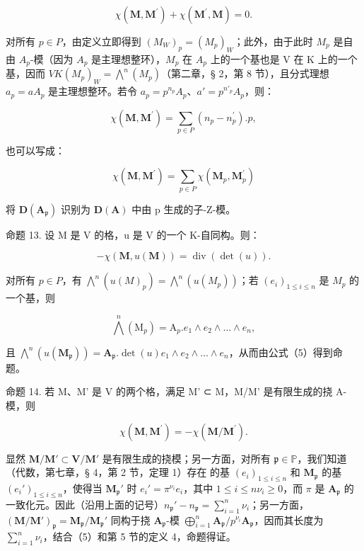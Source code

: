 \[
\chi (\mathbf {M}, \mathbf {M} ^ {\prime}) + \chi (\mathbf {M} ^ {\prime}, \mathbf {M}) = 0\tag{4}.
\]

对所有 \(p \in P\)，由定义立即得到 \((M_{W})_p = (M_p)_{W}\)；此外，由于此时 \(M_p\) 是自由 \(A_p\)-模（因为 \(A_p\) 是主理想整环），\(M_p\) 在 \(A_p\) 上的一个基也是 V 在 K 上的一个基，因而 \(V\)\(K\)\((M_p)_W = \bigwedge^n (M_p)\)（第二章，§ 2，第 8 节），且分式理想 \(a_p = aA_p\) 是主理想整环。若令 \(a_p = p^{n_p} A_p\)、\(a' = p^{n'_{p}} A_p\)，则：

\[
\chi (\mathbf {M}, \mathbf {M} ^ {\prime}) = \sum_ {p \in P} (n _ {p} - n _ {p} ^ {\prime}). p,
\]

也可以写成：

\[
\chi (\mathbf {M}, \mathbf {M} ^ {\prime}) = \sum_ {p \in P} \chi (\mathbf {M} _ {p}, \mathbf {M} _ {p} ^ {\prime})\tag{5}
\]

将 \(\mathbf{D}(\mathbf{A}_{\mathfrak{p}})\) 识别为 \(\mathbf{D}(\mathbf{A})\) 中由 p 生成的子-Z-模。

命题 13. 设 M 是 V 的格，u 是 V 的一个 K-自同构。则：

\[
- \chi (\mathbf {M}, u (\mathbf {M})) = \operatorname{div} (\det (u)).\tag{6}
\]

对所有 \(p \in P\)，有 \(\bigwedge^{n} (u(M)_{p}) = \bigwedge^{n} (u(M_{p}))\)；若 \((e_{i})_{1 \leqslant i \leqslant n}\) 是 \(M_{p}\) 的一个基，则

\[
\bigwedge^ {n} \left(\mathrm{M} _ {p}\right) = \mathrm{A} _ {p}. e _ {1} \wedge e _ {2} \wedge \dots \wedge e _ {n},
\]

且 \(\bigwedge^{n}(u(\mathbf{M}_{\mathfrak{p}})) = \mathbf{A}_{\mathfrak{p}}.\det (u)e_{1}\wedge e_{2}\wedge \dots \wedge e_{n}\)，从而由公式（5）得到命题。

命题 14. 若 M、M' 是 V 的两个格，满足 M' ⊂ M，M/M' 是有限生成的挠 A-模，则

\[
\chi (\mathbf {M}, \mathbf {M} ^ {\prime}) = - \chi (\mathbf {M} / \mathbf {M} ^ {\prime}).\tag{7}
\]

显然 \(\mathbf{M} / \mathbf{M}' \subset \mathbf{V} / \mathbf{M}'\) 是有限生成的挠模；另一方面，对所有 \(\mathfrak{p} \in \mathbb{P}\)，我们知道（代数，第七章，§ 4，第 2 节，定理 1）存在  的基 \((e_i)_{1 \leqslant i \leqslant n}\) 和 \(\mathbf{M}_{\mathfrak{p}}\) 的基 \((e_i')_{1 \leqslant i \leqslant n}\)，使得当 \(\mathbf{M}_{\mathfrak{p}}'\) 时 \(e_i' = \pi^{\nu_i} e_i\)，其中 \(1 \leqslant i \leqslant n\)\(\nu_i \geqslant 0\)，而 \(\pi\) 是 \(\mathbf{A}_{\mathfrak{p}}\) 的一致化元。因此（沿用上面的记号）\(n_{\mathfrak{p}}' - n_{\mathfrak{p}} = \sum_{i=1}^{n} \nu_i\)；另一方面，\((\mathbf{M} / \mathbf{M}')_{\mathfrak{p}} = \mathbf{M}_{\mathfrak{p}} / \mathbf{M}_{\mathfrak{p}}'\) 同构于挠 \(\mathbf{A}_{\mathfrak{p}}\)-模 \(\bigoplus_{i=1}^{n} \mathbf{A}_{\mathfrak{p}} / p^{\nu_i} \mathbf{A}_{\mathfrak{p}}\)，因而其长度为 \(\sum_{i=1}^{n} \nu_i\)，结合（5）和第 5 节的定义 4，命题得证。

